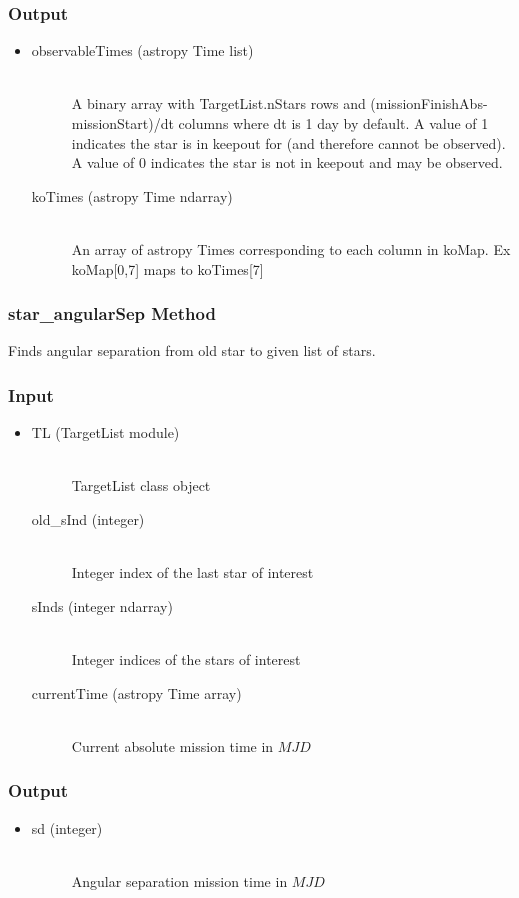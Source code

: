 \documentclass[cleanfoot]{asme2ej}
\begin{document}
\subsubsection*{Output}
\begin{itemize}
\item 
\begin{description}
    \item[observableTimes (astropy Time list)] \hfill \\ A binary array with TargetList.nStars rows and (missionFinishAbs-missionStart)/dt columns where dt is 1 day by default. A value of 1 indicates the star is in keepout for (and therefore cannot be observed). A value of 0 indicates the star is not in keepout and may be observed.
    \item[koTimes (astropy Time ndarray)] \hfill \\ An array of astropy Times corresponding to each column in koMap. Ex koMap[0,7] maps to koTimes[7] 
\end{description}
\end{itemize}

\subsubsection{star\_angularSep Method} \label{sec:starangsep}
Finds angular separation from old star to given list of stars.
\subsubsection*{Input}
\begin{itemize}
\item
\begin{description}
    \item[TL (TargetList module)] \hfill \\ TargetList class object
    \item[old\_sInd (integer)] \hfill \\ Integer index of the last star of interest
    \item[sInds (integer ndarray)] \hfill \\ Integer indices of the stars of interest
    \item[currentTime (astropy Time array)] \hfill \\ Current absolute mission time in $ MJD $
\end{description}
\end{itemize}
\subsubsection*{Output}
\begin{itemize}
\item
\begin{description}
    \item[sd (integer)] \hfill \\ Angular separation mission time in $ MJD $
\end{description}
\end{itemize}
\end{document}
